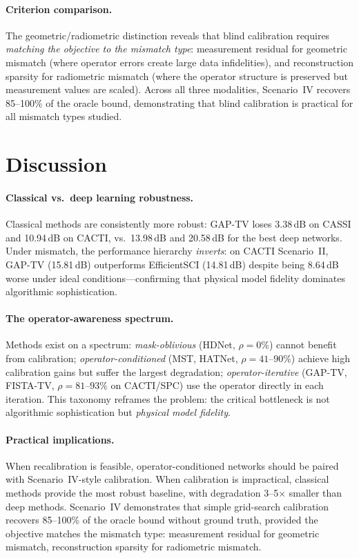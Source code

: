 \documentclass[runningheads]{llncs}
\begin{document}
\paragraph{Criterion comparison.}
The geometric/radiometric distinction reveals that blind calibration requires \emph{matching the objective to the mismatch type}: measurement residual for geometric mismatch (where operator errors create large data infidelities), and reconstruction sparsity for radiometric mismatch (where the operator structure is preserved but measurement values are scaled).
Across all three modalities, Scenario~IV recovers 85--100\% of the oracle bound, demonstrating that blind calibration is practical for all mismatch types studied.

\section{Discussion}
\label{sec:discussion}

\paragraph{Classical vs.\ deep learning robustness.}
Classical methods are consistently more robust: GAP-TV loses 3.38\,dB on CASSI and 10.94\,dB on CACTI, vs.\ 13.98\,dB and 20.58\,dB for the best deep networks.
Under mismatch, the performance hierarchy \emph{inverts}: on CACTI Scenario~II, GAP-TV (15.81\,dB) outperforms EfficientSCI (14.81\,dB) despite being 8.64\,dB worse under ideal conditions---confirming that physical model fidelity dominates algorithmic sophistication.

\paragraph{The operator-awareness spectrum.}
Methods exist on a spectrum: \emph{mask-oblivious} (HDNet, $\rho{=}0\%$) cannot benefit from calibration; \emph{operator-conditioned} (MST, HATNet, $\rho{=}41$--$90\%$) achieve high calibration gains but suffer the largest degradation; \emph{operator-iterative} (GAP-TV, FISTA-TV, $\rho{=}81$--$93\%$ on CACTI/SPC) use the operator directly in each iteration.
This taxonomy reframes the problem: the critical bottleneck is not algorithmic sophistication but \emph{physical model fidelity}.

\paragraph{Practical implications.}
When recalibration is feasible, operator-conditioned networks should be paired with Scenario~IV-style calibration.
When calibration is impractical, classical methods provide the most robust baseline, with degradation 3--5$\times$ smaller than deep methods.
Scenario~IV demonstrates that simple grid-search calibration recovers 85--100\% of the oracle bound without ground truth, provided the objective matches the mismatch type: measurement residual for geometric mismatch, reconstruction sparsity for radiometric mismatch.
\end{document}
